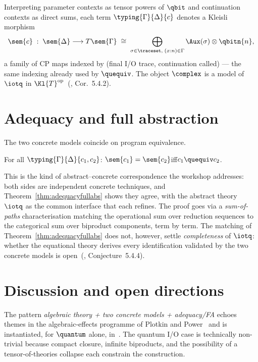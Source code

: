 Interpreting parameter contexts as tensor powers of $\qbit$ and continuation contexts as direct sums, each term $\typing{\Gamma}{\Delta}{c}$ denotes a Kleisli morphism
$$\sem{c} \;:\; \sem{\Delta} \longrightarrow T\sem{\Gamma} \;\cong\; \bigoplus_{\sigma \in \traceset,\; (x:n) \in \Gamma} \Aux(\sigma) \otimes \qbitn{n},$$
a family of CP maps indexed by (final I/O trace, continuation called) --- the same indexing already used by $\quequiv$. The object $\complex$ is a model of $\iotq$ in $\Kl{T}^{\mathrm{op}}$~(\cite{wang_algebraic_2024}, Cor.~5.4.2).

\section{Adequacy and full abstraction}

The two concrete models coincide on program equivalence.
\begin{theorem}\label{thm:adequacyfullabs}
  For all $\typing{\Gamma}{\Delta}{c_1, c_2}$:\quad
  $\sem{c_1}=\sem{c_2}$\quad iff\quad $c_1 \quequiv c_2$.
\end{theorem}
This is the kind of abstract--concrete correspondence the workshop addresses: both sides are independent concrete techniques, and Theorem~\ref{thm:adequacyfullabs} shows they agree, with the abstract theory $\iotq$ as the common interface that each refines. The proof goes via a \emph{sum-of-paths} characterisation matching the operational sum over reduction sequences to the categorical sum over biproduct components, term by term. The matching of Theorem~\ref{thm:adequacyfullabs} does not, however, settle \emph{completeness} of $\iotq$: whether the equational theory derives every identification validated by the two concrete models is open~(\cite{wang_algebraic_2024}, Conjecture~5.4.4).

\section{Discussion and open directions}

The pattern \emph{algebraic theory + two concrete models + adequacy/FA} echoes themes in the algebraic-effects programme of Plotkin and Power~\cite{plotkin_power_2002} and is instantiated, for $\quantum$ alone, in~\cite{statonpopl15}. The quantum I/O case is technically non-trivial because compact closure, infinite biproducts, and the possibility of a tensor-of-theories collapse each constrain the construction.

